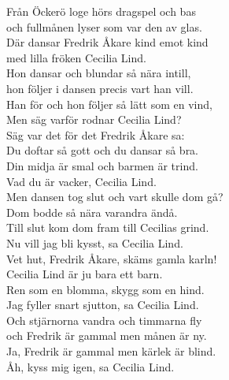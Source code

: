 \documentclass[a6paper, 10pt, twoside]{article}
\begin{document}
\noindent
\begin{center}
\end{center}
\begin{lyrics}
Från Öckerö loge hörs dragspel och bas\\
och fullmånen lyser som var den av glas.\\
Där dansar Fredrik Åkare kind emot kind\\
med lilla fröken Cecilia Lind.
\vspace{5pt}\\
Hon dansar och blundar så nära intill,\\
hon följer i dansen precis vart han vill.\\
Han för och hon följer så lätt som en vind,\\
Men säg varför rodnar Cecilia Lind?
\vspace{5pt}\\
Säg var det för det Fredrik Åkare sa:\\
Du doftar så gott och du dansar så bra.\\
Din midja är smal och barmen är trind.\\
Vad du är vacker, Cecilia Lind.
\vspace{5pt}\\
Men dansen tog slut och vart skulle dom gå?\\
Dom bodde så nära varandra ändå.\\
Till slut kom dom fram till Cecilias grind.\\
Nu vill jag bli kysst, sa Cecilia Lind.
\vspace{5pt}\\
Vet hut, Fredrik Åkare, skäms gamla karln!\\
Cecilia Lind är ju bara ett barn.\\
Ren som en blomma, skygg som en hind.\\
Jag fyller snart sjutton, sa Cecilia Lind.
\vspace{5pt}\\
Och stjärnorna vandra och timmarna fly\\
och Fredrik är gammal men månen är ny.\\
Ja, Fredrik är gammal men kärlek är blind.\\
Åh, kyss mig igen, sa Cecilia Lind.
\end{lyrics}
\end{document}
